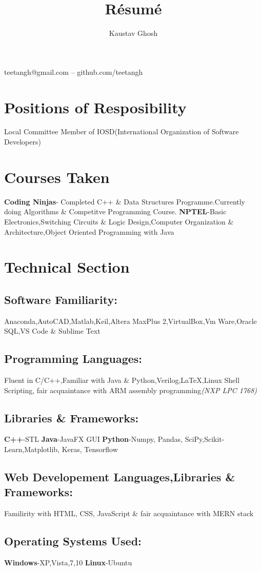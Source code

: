 \documentclass{article}
\makeatletter
\renewcommand{\maketitle}{
    \begin{flushleft}        
        {\huge\rmfamily
        \theauthor}\newline
        \vspace{0.1em}
        \textit{}{teetangh@gmail.com -- github.com/teetangh}         
    \end{flushleft}

}
\makeatother
\begin{document}
    \title{R\'esum\'e}
    \author{Kaustav Ghosh}
    \maketitle

\section{Positions of Resposibility}
    \textmd{Local Committee Member of IOSD(International Organization of Software Developers)}
    \section{Courses Taken}
    \textbf{Coding Ninjas}- Completed C++ \& Data Structures Programme.Currently doing Algorithms \& Competitve Programming Course.
    \newline
    \textbf{NPTEL}-Basic Electronics,Switching Circuits \& Logic Design,Computer Organization \& Architecture,Object Oriented Programming with Java
    
\section*{Technical Section}
        \subsection*{Software Familiarity:}
        Anaconda,AutoCAD,Matlab,Keil,Altera MaxPlus 2,VirtualBox,Vm Ware,Oracle SQL,VS Code \& Sublime Text 
        \subsection*{Programming Languages:}
        Fluent in C/C++,Familiar with Java \& Python,Verilog,{\LaTeX},Linux Shell Scripting,
        fair acquaintance with ARM assembly programming\textit{(NXP LPC 1768)}
        \subsection*{Libraries \& Frameworks:}
            \textbf{C++}-STL    
            \textbf{Java}-JavaFX GUI
            \textbf{Python}-Numpy, Pandas, SciPy,Scikit-Learn,Matplotlib, Keras, Tensorflow    
        \subsection*{Web Developement Languages,Libraries \& Frameworks:}
        Familirity with HTML, CSS, JavaScript \& fair acquaintance with MERN stack
        \subsection*{Operating Systems Used:}
        \textbf{Windows}-XP,Vista,7,10 
        \textbf{Linux}-Ubuntu
\end{document}
